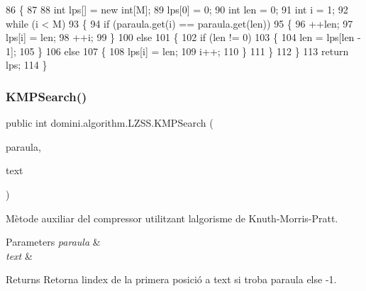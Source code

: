 \begin{DoxyCode}
86     \{ 
87         
88         \textcolor{keywordtype}{int} lps[] = \textcolor{keyword}{new} \textcolor{keywordtype}{int}[M]; 
89         lps[0] = 0;
90         \textcolor{keywordtype}{int} len = 0; 
91         \textcolor{keywordtype}{int} i = 1; 
92         \textcolor{keywordflow}{while} (i < M)
93         \{ 
94             \textcolor{keywordflow}{if} (paraula.get(i) == paraula.get(len))
95             \{ 
96                 ++len; 
97                 lps[i] = len; 
98                 ++i; 
99             \} 
100             \textcolor{keywordflow}{else}
101             \{ 
102                 \textcolor{keywordflow}{if} (len != 0)
103                 \{ 
104                     len = lps[len - 1];
105                 \} 
106                 \textcolor{keywordflow}{else}
107                 \{ 
108                     lps[i] = len; 
109                     i++; 
110                 \} 
111             \} 
112         \} 
113         \textcolor{keywordflow}{return} lps;
114     \}
\end{DoxyCode}
\mbox{\label{classdomini_1_1algorithm_1_1LZSS_a94b98f9eb4a4f60b9b773ecbf7fba276}} 
\subsubsection{\texorpdfstring{K\+M\+P\+Search()}{KMPSearch()}}
{\footnotesize\ttfamily public int domini.\+algorithm.\+L\+Z\+S\+S.\+K\+M\+P\+Search (\begin{DoxyParamCaption}\item[{Array\+List$<$ Byte $>$}]{paraula,  }\item[{\hyperlink{classdomini_1_1utils_1_1ArrayCircular}{Array\+Circular}}]{text }\end{DoxyParamCaption})\hspace{0.3cm}{\ttfamily [inline]}}



Mètode auxiliar del compressor utilitzant l\textquotesingle{}algorisme de Knuth-\/\+Morris-\/\+Pratt. 


\begin{DoxyParams}{Parameters}
{\em paraula} & \\
\hline
{\em text} & \\
\hline
\end{DoxyParams}
\begin{DoxyReturn}{Returns}
Retorna l\textquotesingle{}index de la primera posició a text si troba paraula else -\/1. 
\end{DoxyReturn}

